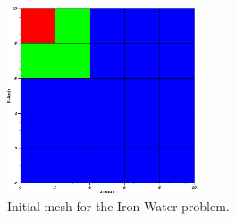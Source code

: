 \begin{figure}
\centering
\includegraphics[width=0.50\textwidth]{figures/sec_DSA/IW_starting_mesh.png}
\caption{Initial mesh for the Iron-Water problem.}
\label{fig::DSA_IW_starting_mesh}
\end{figure}

